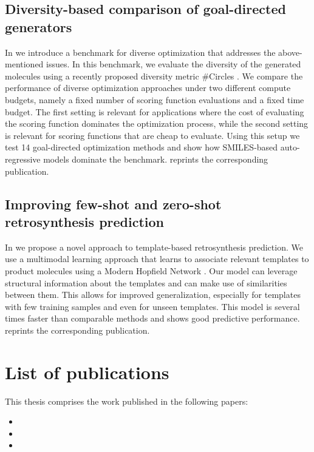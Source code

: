 \subsection{Diversity-based comparison of goal-directed generators\label{sec:divopt}} In
\citep{renzDiverseHitsNovo2024} we introduce a benchmark for diverse optimization
that addresses the above-mentioned issues. In this benchmark, we evaluate the diversity of the
generated molecules using a recently proposed diversity metric \#Circles
\citep{xieHowMuchSpace2023}. We compare the performance of diverse optimization approaches under two
different compute budgets, namely a fixed number of scoring function evaluations and a fixed time
budget. The first setting is relevant for applications where the cost of evaluating the scoring
function dominates the optimization process, while the second setting is relevant for scoring
functions that are cheap to evaluate. Using this setup we test 14 goal-directed optimization methods
and show how SMILES-based auto-regressive models dominate the benchmark. 
reprints the corresponding publication.

\subsection{Improving few-shot and zero-shot retrosynthesis prediction}
In \citep{seidlImprovingFewZeroShot2022} we propose a novel approach to template-based
retrosynthesis prediction. We use a multimodal learning approach that learns to associate relevant
templates to product molecules using a Modern Hopfield Network
\citep{ramsauerHopfieldNetworksAll2020}. Our model can leverage structural information about the
templates and can make use of similarities between them. This allows for improved generalization,
especially for templates with few training samples and even for unseen templates. This model is
several times faster than comparable methods and shows good predictive performance.
 reprints the corresponding publication.

\section{List of publications\label{sec:publications}} This thesis comprises the work published in
the following papers:

\begin{itemize}
    \item {}
    \item {}
    \item {}
\end{itemize}

